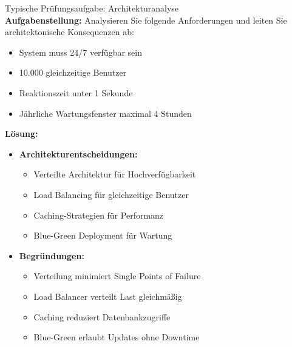 \begin{example2}{Typische Prüfungsaufgabe: Architekturanalyse}\\
\textbf{Aufgabenstellung:}
Analysieren Sie folgende Anforderungen und leiten Sie architektonische Konsequenzen ab:
\begin{itemize}
    \item System muss 24/7 verfügbar sein
    \item 10.000 gleichzeitige Benutzer
    \item Reaktionszeit unter 1 Sekunde
    \item Jährliche Wartungsfenster maximal 4 Stunden
\end{itemize}

\textbf{Lösung:}
\begin{itemize}
    \item \textbf{Architekturentscheidungen:}
    \begin{itemize}
        \item Verteilte Architektur für Hochverfügbarkeit
        \item Load Balancing für gleichzeitige Benutzer
        \item Caching-Strategien für Performanz
        \item Blue-Green Deployment für Wartung
    \end{itemize}
    
    \item \textbf{Begründungen:}
    \begin{itemize}
        \item Verteilung minimiert Single Points of Failure
        \item Load Balancer verteilt Last gleichmäßig
        \item Caching reduziert Datenbankzugriffe
        \item Blue-Green erlaubt Updates ohne Downtime
    \end{itemize}
\end{itemize}
\end{example2}




